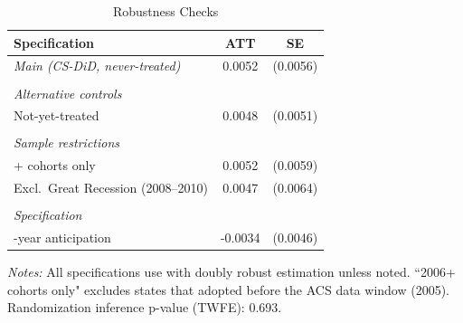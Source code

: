 
\begin{table}[H]
\centering
\caption{Robustness Checks}
\label{tab:robustness}
\begin{threeparttable}
\begin{tabular}{lcc}
\toprule
Specification & ATT & SE \\
\midrule
\textit{Main (CS-DiD, never-treated)} & 0.0052 & (0.0056) \\
\\
\textit{Alternative controls} & & \\
\quad Not-yet-treated & 0.0048 & (0.0051) \\
\\
\textit{Sample restrictions} & & \\
\quad 2006+ cohorts only & 0.0052 & (0.0059) \\
\quad Excl.\ Great Recession (2008--2010) & 0.0047 & (0.0064) \\
\\
\textit{Specification} & & \\
\quad 1-year anticipation & -0.0034 & (0.0046) \\
\bottomrule
\end{tabular}
\begin{tablenotes}[flushleft]
\small
\item \textit{Notes:} All specifications use \citet{callaway2021difference} with doubly robust estimation unless noted. ``2006+ cohorts only" excludes states that adopted before the ACS data window (2005). Randomization inference p-value (TWFE): 0.693.
\end{tablenotes}
\end{threeparttable}
\end{table}
